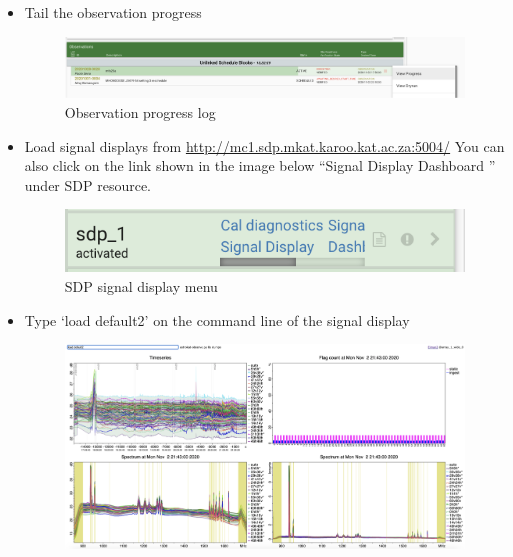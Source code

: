 \begin{itemize}
\item Tail the observation progress


\begin{figure}[H]
	\centering
	\includegraphics[scale=0.2]{Chapters/images/image100.png}
	
	\caption{Observation progress log}
	\label{fig:image100}
\end{figure}


\item Load signal displays from  \url{ http://mc1.sdp.mkat.karoo.kat.ac.za:5004/}
You can also click on the link shown in the image below “Signal Display Dashboard ” under SDP resource.

\begin{figure}[H]
	\centering
	\includegraphics[scale=1]{Chapters/images/image126.png}
	
	\caption{SDP signal display menu }
	\label{fig:image126}
\end{figure}

\item Type ‘load default2’ on the command line of the signal display


\begin{figure}[H]
	\centering
	\includegraphics[scale=0.2]{Chapters/images/image50.png}
	

\end{figure}
\end{itemize}
